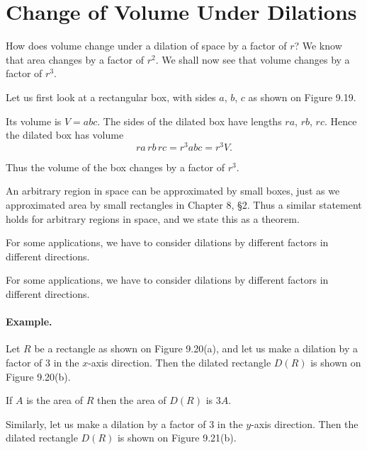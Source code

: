 \documentclass[12pt]{book} %
\begin{document}
\section{Change of Volume Under Dilations}

How does volume change under a dilation of space by a factor of $r$? We know that area changes by a factor of $r^2$. We shall now see that volume changes by a factor of $r^3$.

Let us first look at a rectangular box, with sides $a$, $b$, $c$ as shown on Figure 9.19.


Its volume is $V=abc$. The sides of the dilated box have lengths $ra$, $rb$, $rc$. Hence the dilated box has volume
\[
ra\,rb\,rc=r^3abc=r^3V.
\]

Thus the volume of the box changes by a factor of $r^3$.

An arbitrary region in space can be approximated by small boxes, just as we approximated area by small rectangles in Chapter 8, \S2. Thus a similar statement holds for arbitrary regions in space, and we state this as a theorem.


For some applications, we have to consider dilations by different factors in different directions.

For some applications, we have to consider dilations by different factors in different directions.

\paragraph{Example.}
Let $R$ be a rectangle as shown on Figure 9.20(a), and let us make a dilation by a factor of 3 in the $x$-axis direction. Then the dilated rectangle $D(R)$ is shown on Figure 9.20(b).


If $A$ is the area of $R$ then the area of $D(R)$ is $3A$.

Similarly, let us make a dilation by a factor of 3 in the $y$-axis direction. Then the dilated rectangle $D(R)$ is shown on Figure 9.21(b).

\end{document}
